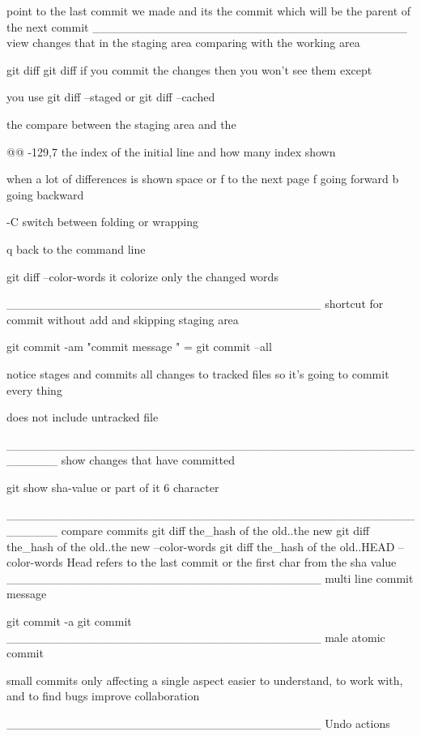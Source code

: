 point to the last commit we made and its the commit which will be the parent of the next commit 
_____________________________________
              view changes that in the staging area comparing with  the working area

git diff 
git diff 
if you commit the changes then you won't see them  except 

you use  
git diff --staged   or  git diff --cached 

the compare between the staging area and the 

@@  -129,7    the index of the initial line and how many index shown 

when a lot of differences is shown 
space or f     to the next page 
f   going forward
b going backward 

-C     switch between folding or wrapping 

q back to the command line 


git diff --color-words
it  colorize only the changed words 

_____________________________________
        shortcut for commit without add and skipping staging area

git commit -am "commit message "  =  git commit --all

notice 
stages and commits all changes to tracked files so it's going to commit every thing 

does not include untracked file 


______________________________________________________
        show changes that have committed 

git show sha-value   or part of it   6 character


______________________________________________________
                          compare commits 
git diff the_hash of the old..the new 
git diff the_hash of the old..the new --color-words 
git diff the_hash of the old..HEAD --color-words 
Head refers to the last commit 
or the first char from the sha value 
_____________________________________
              multi line commit message 
                          
git commit -a 
git commit 
_____________________________________
                male atomic commit 

small commits 
only affecting a single aspect 
easier to understand, to work with, and to find bugs 
improve collaboration 

_____________________________________
Undo actions 

